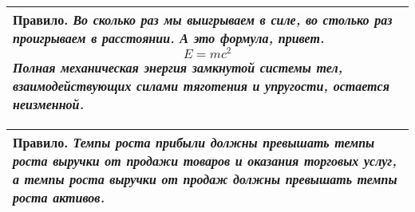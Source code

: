 \documentclass[a4paper,11pt]{article} %
\newenvironment{pravilo}{\begin{center} \begin{tabular}{|p{0.6 \textwidth}|} \hline \textbf{Правило.} \em}{ \\ \hline \end{tabular} \end{center}}
\begin{document}
		\begin{pravilo}
			Во сколько раз мы выигрываем в силе, во столько раз проигрываем в расстоянии. А это формула, привет.
			$$ E = m c^2 $$
			Полная механическая энергия замкнутой системы тел, взаимодействующих силами тяготения и упругости, остается неизменной.
		\end{pravilo}
	
		\begin{pravilo}
			Темпы роста прибыли должны превышать темпы роста выручки от продажи товаров и оказания торговых услуг, а темпы роста выручки от продаж должны превышать темпы роста активов.
		\end{pravilo}
		
\end{document}
